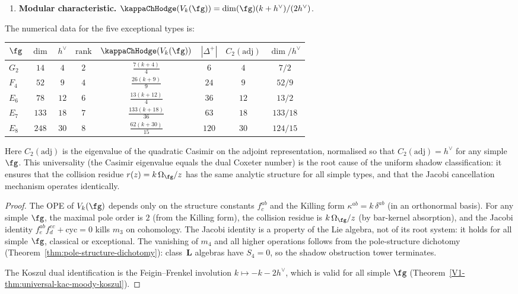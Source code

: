 \begin{proposition}
\begin{enumerate}[label=\textup{(\roman*)},nosep]
\item \textbf{Modular characteristic.}
 $\kappaChHodge(V_k(\fg)) = \dim(\fg)(k + h^\vee)/(2h^\vee)$.
\end{enumerate}
The numerical data for the five exceptional types is:
\begin{center}
\renewcommand{\arraystretch}{1.3}
\small
\begin{tabular}{lccccccc}
$\fg$ & $\dim$ & $h^\vee$ & $\mathrm{rank}$
 & $\kappaChHodge(V_k(\fg))$
 & $|\Delta^+|$
 & $C_2(\mathrm{adj})$
 & $\dim/h^\vee$ \\
\hline
$G_2$ & $14$ & $4$ & $2$
 & $\frac{7(k+4)}{4}$
 & $6$ & $4$ & $7/2$ \\
$F_4$ & $52$ & $9$ & $4$
 & $\frac{26(k+9)}{9}$
 & $24$ & $9$ & $52/9$ \\
$E_6$ & $78$ & $12$ & $6$
 & $\frac{13(k+12)}{4}$
 & $36$ & $12$ & $13/2$ \\
$E_7$ & $133$ & $18$ & $7$
 & $\frac{133(k+18)}{36}$
 & $63$ & $18$ & $133/18$ \\
$E_8$ & $248$ & $30$ & $8$
 & $\frac{62(k+30)}{15}$
 & $120$ & $30$ & $124/15$
\end{tabular}
\end{center}
Here $C_2(\mathrm{adj})$ is the eigenvalue of the quadratic
Casimir on the adjoint representation,
normalised so that $C_2(\mathrm{adj}) = h^\vee$ for any
simple~$\fg$. This universality
(the Casimir eigenvalue equals the dual Coxeter number)
is the root cause of the uniform shadow classification:
it ensures that the collision residue
$r(z) = k\,\Omega_\fg/z$ has the same analytic structure
for all simple types, and that the Jacobi cancellation
mechanism operates identically.
\end{proposition}

\begin{proof}
The OPE of $V_k(\fg)$ depends only on the structure constants
$f^{ab}_c$ and the Killing form $\kappa^{ab} = k\,\delta^{ab}$
(in an orthonormal basis). For any simple $\fg$, the maximal
pole order is $2$ (from the Killing form), the collision residue
is $k\,\Omega_\fg/z$ (by bar-kernel absorption), and the Jacobi
identity $f^{ab}_e f^{ec}_d + \mathrm{cyc} = 0$ kills $m_3$ on
cohomology. The Jacobi identity is a property of the Lie algebra,
not of its root system: it holds for all simple $\fg$, classical
or exceptional. The vanishing of $m_4$ and all higher operations
follows from the pole-structure dichotomy
(Theorem~\ref{thm:pole-structure-dichotomy}): class~$\mathbf{L}$
algebras have $S_4 = 0$, so the shadow obstruction tower terminates.

The Koszul dual identification is the Feigin--Frenkel involution
$k \mapsto -k - 2h^\vee$, which is valid for all simple $\fg$
(Theorem~\ref*{V1-thm:universal-kac-moody-koszul}).
\end{proof}


